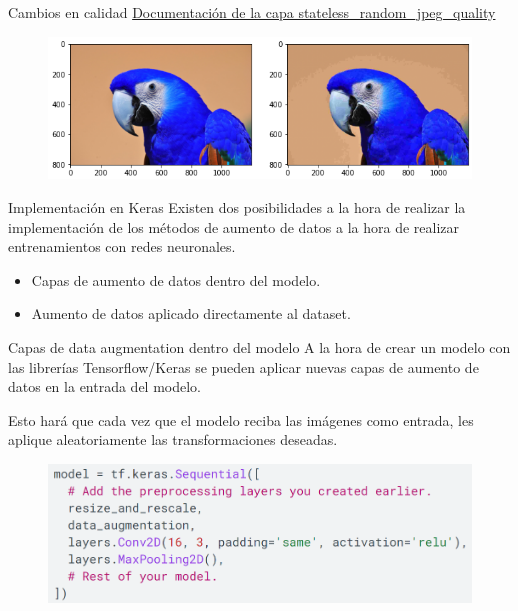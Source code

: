 \begin{frame}{Cambios en calidad}
\textcolor{blue}{\href{https://www.tensorflow.org/api_docs/python/tf/image/stateless_random_jpeg_quality}{Documentación de la capa stateless\_random\_jpeg\_quality}}
\begin{figure}
    \centering
    \includegraphics[width=\textwidth]{figures/Tema 3/Quality.png}
\end{figure}
\end{frame}

\begin{frame}{Implementación en Keras}
Existen dos posibilidades a la hora de realizar la implementación de los métodos de aumento de datos a la hora de realizar \alert{entrenamientos} con redes neuronales.

\begin{itemize}
    \item Capas de aumento de datos \alert{dentro del modelo}.
    \item Aumento de datos aplicado directamente al \alert{dataset}.
\end{itemize}
\end{frame}

\begin{frame}{Capas de data augmentation dentro del modelo}
A la hora de crear un modelo con las librerías \alert{Tensorflow/Keras} se pueden aplicar nuevas capas de aumento de datos en la \alert{entrada} del modelo.

Esto hará que cada vez que el modelo \alert{reciba las imágenes} como entrada, les aplique aleatoriamente las \alert{transformaciones} deseadas.

\begin{figure}
    \centering
    \includegraphics[width=\textwidth]{figures/Tema 3/DAKeras_1.png}
\end{figure}
\end{frame}

